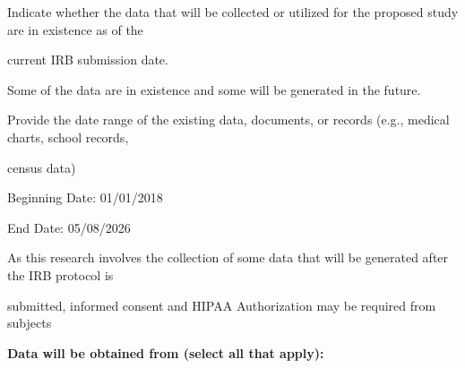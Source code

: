 \documentclass[10pt, letterpaper]{article}
\begin{document}
Indicate whether the data that will be collected or utilized for the proposed study are in existence as of the

current IRB submission date.

\vspace{0.5em}

\vspace{0.5em}

\begin{responsebox}

Some of the data are in existence and some will be generated in the future.

\vspace{0.5em}

\vspace{0.5em}

Provide the date range of the existing data, documents, or records (e.g., medical charts, school records,

census data)

\vspace{0.5em}

\vspace{0.5em}

Beginning Date: 01/01/2018

End Date:       05/08/2026

\vspace{0.5em}

\vspace{0.5em}

\vspace{0.5em}

As this research involves the collection of some data that will be generated after the IRB protocol is

submitted, informed consent and HIPAA Authorization may be required from subjects

\vspace{0.5em}

\vspace{0.5em}

\vspace{0.5em}

\vspace{0.5em}

\end{responsebox}

\noindent \textbf{Data will be obtained from (select all that apply):}

\vspace{0.5em}

\vspace{0.5em}
\end{document}
